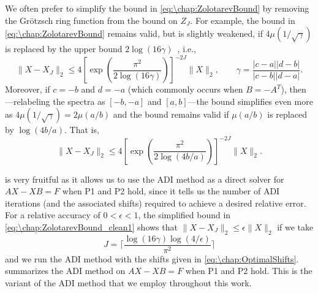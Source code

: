 We often prefer to simplify the bound in \cref{eq:\chap:ZolotarevBound} by removing the Gr\"{o}tzsch ring function from the bound on $Z_J$. For example, the bound in \cref{eq:\chap:ZolotarevBound} remains valid, but is slightly weakened, if $4\mu(1/\sqrt{\gamma})$ is replaced by the upper bound $2\log(16\gamma)$~\cite{Beckermann_17_01}, i.e., 
\begin{equation}
\|X-X_J\|_2\leq 4\left[\exp\left(\frac{\pi^2}{2\log(16\gamma)}\right)\right]^{-2J}\|X\|_2, \qquad \gamma = \frac{|c-a||d-b|}{|c-b||d-a|}.
\label{eq:\chap:ZolotarevBound_clean1}
\end{equation}
Moreover, if $c=-b$ and $d=-a$ (which commonly occurs when $B=-A^T$), then---relabeling the spectra as $[-b,-a]$ and $[a,b]$---the bound simplifies even more as $4\mu(1/\sqrt{\gamma}) = 2\mu(a/b)$ and the bound remains valid if $\mu(a/b)$ is replaced by $\log(4b/a)$. That is,
\begin{equation}
\|X-X_J\|_2\leq 4\left[\exp\left(\frac{\pi^2}{2\log(4b/a)}\right)\right]^{-2J}\|X\|_2.
\label{eq:\chap:ZolotarevBound_clean2}
\end{equation}

 is very fruitful as it allows us to use the ADI method as a direct solver for $AX-XB=F$ when P1 and P2 hold, since it tells us the number of ADI iterations (and the associated shifts) required to achieve a desired relative error.  For a relative accuracy of $0<\epsilon<1$, the simplified bound in \cref{eq:\chap:ZolotarevBound_clean1} shows that $\|X-X_J\|_2 \leq \epsilon \|X\|_2$ if we take
\begin{equation}
J = \bigg\lceil \frac{\log(16\gamma)\log(4/\epsilon)}{\pi^2} \bigg\rceil
\label{eq:\chap:ADIIterations}
\end{equation}
and we run the ADI method with the shifts given in \cref{eq:\chap:OptimalShifts}.  summarizes the ADI method on $AX-XB=F$ when P1 and P2 hold.  This is the variant of the ADI method that we employ throughout this work.

